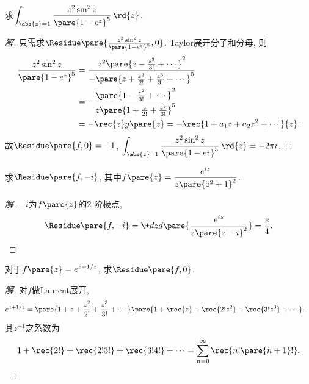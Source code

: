 \documentclass{ctexart}
\begin{document}
\begin{sample}
    \begin{ex}
        求$\displaystyle \int_{\abs{z}=1} \frac{z^2\sin^2 z}{\pare{1-e^z}^5}\,\rd{z}$.
    \end{ex}
    \begin{proof}[解]
        只需求$\Residue\pare{\frac{z^2\sin^2 z}{\pare{1-e^z}^5}, 0}$. Taylor展开分子和分母, 则
        \begin{align*}
            \frac{z^2\sin^2 z}{\pare{1-e^z}^5} &= \frac{z^2 \pare{z-\frac{z^3}{3!} + \cdots}^2}{-\pare{z+\frac{z^2}{2!} + \frac{z^3}{3!} + \cdots}^5}\\ &= -\frac{\pare{1-\frac{z^2}{3!} + \cdots}^2}{z\pare{1+\frac{z}{2!}+\frac{z^3}{3!}}^5} \\
            &= -\rec{z}g\pare{z} = -\rec{1+a_1z + a_2z^2 + \cdots}{z}.
        \end{align*}
        故$\Residue\pare{f,0} = -1$, $\displaystyle \int_{\abs{z}=1} \frac{z^2\sin^2 z}{\pare{1-e^z}^5}\,\rd{z} = -2\pi i$.
    \end{proof}
\end{sample}
\begin{sample}
    \begin{ex}
        求$\Residue\pare{f,-i}$, 其中$\displaystyle f\pare{z} = \frac{e^{iz}}{z\pare{z^2+1}^2}$.
    \end{ex}
    \begin{proof}[解]
        $-i$为$f\pare{z}$的$2$-阶极点,
        \[ \Residue\pare{f,-i} = \+dzd{}\pare{\frac{e^{iz}}{z\pare{z-i}^2}} = \frac{e}{4}. \]
    \end{proof}
\end{sample}
\begin{sample}
    \begin{ex}
        对于$\displaystyle f\pare{z} = e^{z+1/z}$, 求$\Residue\pare{f,0}$.
    \end{ex}
    \begin{proof}[解]
        对$f$做Laurent展开,
        \begin{align*}
            e^{z+1/z} &= \pare{1+z+\frac{z^2}{2!}+\frac{z^3}{3!}+\cdots}\pare{1+\rec{z}+\rec{2!z^2}+\rec{3!z^3}+\cdots}.
        \end{align*}
        其$z^{-1}$之系数为
        \[ 1 + \rec{2!} + \rec{2!3!} + \rec{3!4!} + \cdots = \sum_{n=0}^\infty \rec{n!\pare{n+1}!}. \qedhere \]
    \end{proof}
\end{sample}
\end{document}
